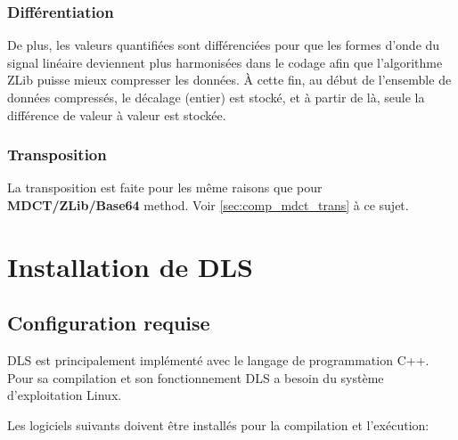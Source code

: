 \documentclass[a4paper,12pt,BCOR6mm,bibtotoc,idxtotoc]{scrbook}
\begin{document}
\subsection{Diff\'erentiation}

De plus, les valeurs quantifi\'ees sont diff\'erenci\'ees pour que les
formes d'onde du signal lin\'eaire deviennent plus harmonis\'ees dans
le codage afin que l'algorithme ZLib puisse mieux compresser les
donn\'ees.  \`A cette fin, au d\'ebut de l'ensemble de donn\'ees
compress\'es, le d\'ecalage (entier) est stock\'e, et \`a partir de
l\`a, seule la diff\'erence de valeur \`a valeur est stock\'ee.

\subsection{Transposition}

La transposition est faite pour les m\^eme raisons que pour
\textbf{MDCT/ZLib/Base64} method. Voir \autoref{sec:comp_mdct_trans}
\`a ce sujet.


\appendix

\chapter{Installation de DLS}
\label{sec:apx_install} 

\section{Configuration requise}

DLS est principalement impl\'ement\'e avec le langage de programmation
C++. Pour sa compilation et son fonctionnement DLS a besoin
du syst\`eme d'exploitation Linux.

Les logiciels suivants doivent \^etre install\'es pour la compilation
et l'ex\'ecution:
\end{document}
